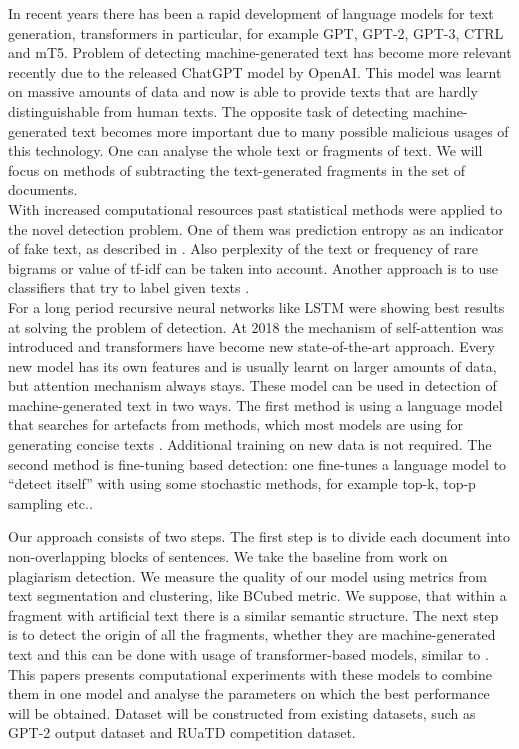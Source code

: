 \documentclass{article}
\begin{document}
In recent years there has been a rapid development of language models for text generation, transformers in particular, for example GPT\cite{gpt}, GPT-2\cite{gpt2}, GPT-3\cite{gpt3}, CTRL\cite{ctrl} and mT5\cite{mt5}. Problem of detecting machine-generated text has become more relevant recently due to the released ChatGPT model by OpenAI. This model was learnt on massive amounts of data and now is able to provide texts that are hardly distinguishable from human texts. The opposite task of detecting machine-generated text becomes more important due to many possible malicious usages of this technology. One can analyse the whole text or fragments of text.
We will focus on methods of subtracting the text-generated fragments in the set of documents.\\
With increased computational resources past statistical methods were applied to the novel detection problem. One of them was prediction entropy as an indicator of fake text, as described in \cite{relativeentropy}. Also perplexity\cite{perplexity} of the text or frequency of rare bigrams \cite{rare_bigrams} or value of tf-idf \cite{solaiman} can be taken into account. Another approach is to use classifiers that try to label given texts \cite{Kuznetsov}.\\
For a long period recursive neural networks like LSTM were showing best results at solving the problem of detection. At 2018 the mechanism of self-attention\cite{Vaswani} was introduced and transformers have become new state-of-the-art approach.  Every new model has its own features and is usually learnt on larger amounts of data, but attention mechanism always stays. These model can be used in detection of machine-generated text in two ways\cite{solaiman}. The first method is using a language model that searches for artefacts from  methods, which most models are using for generating concise texts \cite{gltr}. Additional training on new data is not required. The second method is fine-tuning based detection: one fine-tunes a language model to “detect itself” with using some stochastic methods, for example top-k, top-p sampling etc.\cite{gritsay2022}.

Our approach consists of two steps. The first step is to divide each document into non-overlapping blocks of sentences. We take the baseline from work\cite{Kuznetsov} on plagiarism detection.  We measure the quality of our model using metrics from text segmentation and clustering, like BCubed metric. We suppose, that within a fragment with artificial text there is a similar semantic structure.  The next step is to detect the origin of all the fragments, whether they are machine-generated text and this can be done with usage of transformer-based models, similar to \cite{gritsay2022}. This papers presents computational experiments with these models to combine them in one model and analyse the parameters on which the best performance will be obtained. Dataset will be constructed from existing datasets, such as GPT-2 output dataset\cite{gpt2-dataset} and RUaTD competition dataset\cite{ruatd-dataset}.  %
\end{document}

